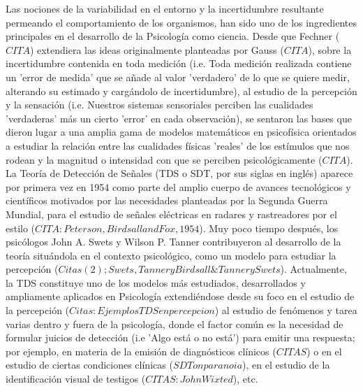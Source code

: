 Las nociones de la variabilidad en el entorno y la incertidumbre resultante permeando el comportamiento de los organismos, han sido uno de los ingredientes principales en el desarrollo de la Psicología como ciencia. Desde que Fechner ($CITA$) extendiera las ideas originalmente planteadas por Gauss ($CITA$), sobre la incertidumbre contenida en toda medición (i.e. Toda medición realizada contiene un 'error de medida' que se añade al valor 'verdadero' de lo que se quiere medir, alterando su estimado y cargándolo de incertidumbre), al estudio de la percepción y la sensación (i.e. Nuestros sistemas sensoriales perciben las cualidades 'verdaderas' más un cierto 'error' en cada observación), se sentaron las bases que dieron lugar a una amplia gama de modelos matemáticos en psicofísica orientados a estudiar la relación entre las cualidades físicas 'reales' de los estímulos que nos rodean y la magnitud o intensidad con que se perciben psicológicamente ($CITA$).\\

La Teoría de Detección de Señales (TDS o SDT, por sus siglas en inglés) aparece por primera vez en 1954 como parte del amplio cuerpo de avances tecnológicos y científicos motivados por las necesidades planteadas por la Segunda Guerra Mundial, para el estudio de señales eléctricas en radares y rastreadores por el estilo ($CITA: Peterson, Birdsall and Fox, 1954$). Muy poco tiempo después, los psicólogos John A. Swets y Wilson P. Tanner contribuyeron al desarrollo de la teoría situándola en el contexto psicológico, como un modelo para estudiar la percepción ($Citas (2); Swets, Tanner y Birdsall  \& Tanner y Swets$). Actualmente, la TDS constituye uno de los modelos más estudiados, desarrollados y ampliamente aplicados en Psicología extendiéndose desde su foco en el estudio de la percepción ($Citas: Ejemplos TDS en percepcion$) al estudio de fenómenos y tarea varias dentro y fuera de la psicología, donde el factor común es la necesidad de formular juicios de detección (i.e 'Algo está o no está') para emitir una respuesta; por ejemplo, en materia de la emisión de diagnósticos clínicos ($CITAS$) o en el estudio de ciertas condiciones clínicas ($SDT on paranoia$), en el estudio de la identificación visual de testigos ($CITAS: John Wixted$), etc.\\ 

